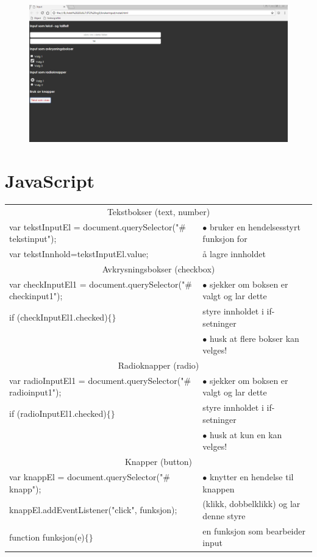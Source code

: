 \documentclass[a4paper, norsk, 10pt]{article}
\begin{document}
\begin{figure}[h!]
\includegraphics[width=0.75\linewidth]{css2.png}
\end{figure}

\clearpage
\section*{JavaScript}
\begin{tabular}{|p{10cm}|p{6cm}|}
\hline
\multicolumn{2}{|c|}{\large{Tekstbokser (text, number) } \cellcolor{lightgray}} \\
var tekstInputEl = document.querySelector("$\#$tekstinput"); & $\bullet$ bruker en hendelsesstyrt funksjon for\\
var tekstInnhold=tekstInputEl.value; &  å lagre innholdet\\
\multicolumn{2}{|c|}{\large{Avkrysningsbokser (checkbox) } \cellcolor{lightgray}} \\
var checkInputEl1 = document.querySelector("$\#$checkinput1"); & $\bullet$ sjekker om boksen er valgt og lar dette\\
if (checkInputEl1.checked)$\{\}$ & styre innholdet i if-setninger\\
& $\bullet$ husk at flere bokser kan velges! \\
\multicolumn{2}{|c|}{\large{Radioknapper (radio) } \cellcolor{lightgray}} \\
var radioInputEl1 = document.querySelector("$\#$radioinput1"); & $\bullet$ sjekker om boksen er valgt og lar dette\\
if (radioInputEl1.checked)$\{\}$ & styre innholdet i if-setninger\\
& $\bullet$ husk at kun en kan velges! \\
\multicolumn{2}{|c|}{\large{Knapper (button)} \cellcolor{lightgray}} \\
var knappEl = document.querySelector("$\#$knapp"); & $\bullet$ knytter en hendelse til knappen\\
knappEl.addEventListener("click", funksjon); &(klikk, dobbelklikk) og lar denne styre \\
function funksjon(e)$\{\}$ & en funksjon som bearbeider input\\
\hline
\end{tabular}\\
\end{document}
